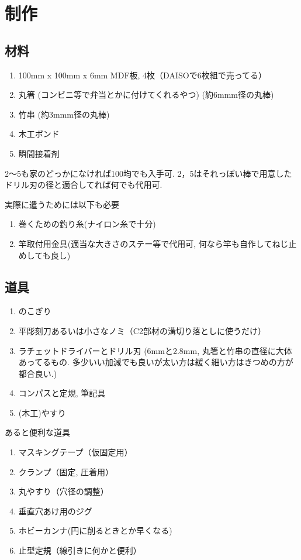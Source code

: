 \documentclass{jarticle}
\begin{document}
\section{制作}
\subsection{材料}
\begin{enumerate}
\item 100mm x 100mm x 6mm MDF板, 4枚（DAISOで6枚組で売ってる）
\item 丸箸 (コンビニ等で弁当とかに付けてくれるやつ) (約6mmm径の丸棒)
\item 竹串 (約3mmm径の丸棒)
\item 木工ボンド
\item 瞬間接着剤
\end{enumerate}
2～5も家のどっかになければ100均でも入手可.
2，5はそれっぽい棒で用意したドリル刃の径と適合してれば何でも代用可.

実際に遣うためには以下も必要
\begin{enumerate}
\item 巻くための釣り糸(ナイロン糸で十分)
\item 竿取付用金具(適当な大きさのステー等で代用可, 何なら竿も自作してねじ止めしても良し)
\end{enumerate}

\subsection{道具}
\begin{enumerate}
\item のこぎり
\item 平彫刻刀あるいは小さなノミ（C2部材の溝切り落としに使うだけ）
\item ラチェットドライバーとドリル刃
	(6mmと2.8mm, 丸箸と竹串の直径に大体あってるもの.
	多少いい加減でも良いが太い方は緩く細い方はきつめの方が都合良い.)
\item コンパスと定規, 筆記具
\item (木工)やすり
\end{enumerate}

あると便利な道具
\begin{enumerate}
\item マスキングテープ（仮固定用）
\item クランプ（固定, 圧着用）
\item 丸やすり（穴径の調整）
\item 垂直穴あけ用のジグ
\item ホビーカンナ(円に削るときとか早くなる)
\item 止型定規（線引きに何かと便利）
\end{enumerate}
\end{document}
